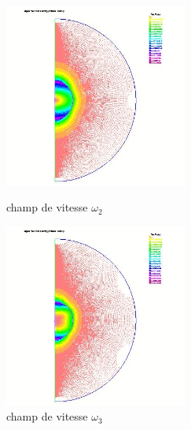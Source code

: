 \documentclass[a4paper]{report}
\begin{document}
\begin{figure}
\begin{minipage}[!htbp]{0.5\linewidth}
\centering
\includegraphics[width=6cm]{3_3_1_champ_de_vitesse_2.jpeg}
\caption{champ de vitesse $\omega_2$}
\end{minipage}
\begin{minipage}[!htbp]{0.5\linewidth}
\centering
\includegraphics[width=6cm]{3_3_1_champ_de_vitesse_3.jpeg}
\caption{champ de vitesse $\omega_3$}
\end{minipage}
\end{figure}
\newpage
\end{document}
